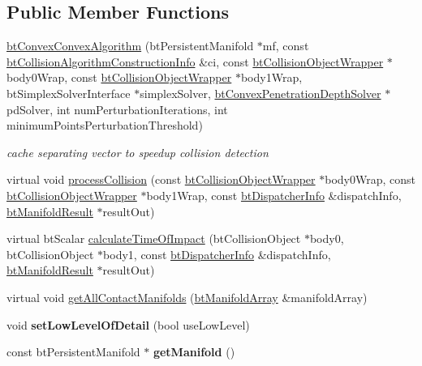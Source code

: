 \subsection*{Public Member Functions}
\begin{DoxyCompactItemize}
\item 
\hypertarget{classbt_convex_convex_algorithm_af60334d81e10602a003a0d92ae918af4}{\hyperlink{classbt_convex_convex_algorithm_af60334d81e10602a003a0d92ae918af4}{bt\+Convex\+Convex\+Algorithm} (bt\+Persistent\+Manifold $\ast$mf, const \hyperlink{structbt_collision_algorithm_construction_info}{bt\+Collision\+Algorithm\+Construction\+Info} \&ci, const \hyperlink{structbt_collision_object_wrapper}{bt\+Collision\+Object\+Wrapper} $\ast$body0\+Wrap, const \hyperlink{structbt_collision_object_wrapper}{bt\+Collision\+Object\+Wrapper} $\ast$body1\+Wrap, bt\+Simplex\+Solver\+Interface $\ast$simplex\+Solver, \hyperlink{classbt_convex_penetration_depth_solver}{bt\+Convex\+Penetration\+Depth\+Solver} $\ast$pd\+Solver, int num\+Perturbation\+Iterations, int minimum\+Points\+Perturbation\+Threshold)}\label{classbt_convex_convex_algorithm_af60334d81e10602a003a0d92ae918af4}

\begin{DoxyCompactList}\small\item\em cache separating vector to speedup collision detection \end{DoxyCompactList}\item 
virtual void \hyperlink{classbt_convex_convex_algorithm_ab566631355a17f7a4bcbddf9454eb9e5}{process\+Collision} (const \hyperlink{structbt_collision_object_wrapper}{bt\+Collision\+Object\+Wrapper} $\ast$body0\+Wrap, const \hyperlink{structbt_collision_object_wrapper}{bt\+Collision\+Object\+Wrapper} $\ast$body1\+Wrap, const \hyperlink{structbt_dispatcher_info}{bt\+Dispatcher\+Info} \&dispatch\+Info, \hyperlink{classbt_manifold_result}{bt\+Manifold\+Result} $\ast$result\+Out)
\item 
virtual bt\+Scalar \hyperlink{classbt_convex_convex_algorithm_a55f817b690c4e858d2b02607b382ce6b}{calculate\+Time\+Of\+Impact} (bt\+Collision\+Object $\ast$body0, bt\+Collision\+Object $\ast$body1, const \hyperlink{structbt_dispatcher_info}{bt\+Dispatcher\+Info} \&dispatch\+Info, \hyperlink{classbt_manifold_result}{bt\+Manifold\+Result} $\ast$result\+Out)
\item 
virtual void \hyperlink{classbt_convex_convex_algorithm_aa2a195cdd3b45c169c15ea2de85c4038}{get\+All\+Contact\+Manifolds} (\hyperlink{classbt_aligned_object_array}{bt\+Manifold\+Array} \&manifold\+Array)
\item 
\hypertarget{classbt_convex_convex_algorithm_a64464ed857fba6750ded542c47ee4e45}{void {\bfseries set\+Low\+Level\+Of\+Detail} (bool use\+Low\+Level)}\label{classbt_convex_convex_algorithm_a64464ed857fba6750ded542c47ee4e45}

\item 
\hypertarget{classbt_convex_convex_algorithm_a16a0cc2ea9ef78c3417ab93c3bfff012}{const bt\+Persistent\+Manifold $\ast$ {\bfseries get\+Manifold} ()}\label{classbt_convex_convex_algorithm_a16a0cc2ea9ef78c3417ab93c3bfff012}

\end{DoxyCompactItemize}
